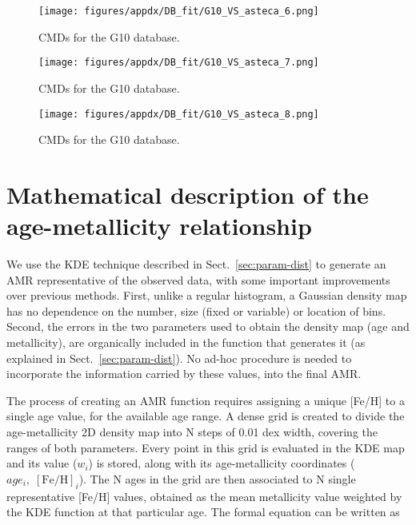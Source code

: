 \documentclass[draft]{aa}
\begin{document}
\begin{appendix}
\begin{figure*}
\texttt{[image: figures/appdx/DB\_fit/G10\_VS\_asteca\_6.png]}
\caption{CMDs for the G10 database.}
\label{fig:DBs_G10_6}
\end{figure*}
\clearpage

\begin{figure*}
\texttt{[image: figures/appdx/DB\_fit/G10\_VS\_asteca\_7.png]}
\caption{CMDs for the G10 database.}
\label{fig:DBs_G10_7}
\end{figure*}
\clearpage

\begin{figure}
\centering
\texttt{[image: figures/appdx/DB\_fit/G10\_VS\_asteca\_8.png]}
\caption{CMDs for the G10 database.}
\label{fig:DBs_G10_8}
\end{figure}





\section{Mathematical description of the age-metallicity relationship}
\label{apdx:amr_description}

We use the KDE technique described in Sect.~\ref{sec:param-dist} to
generate an AMR representative of the observed data, with some important
improvements over previous methods.
%
First, unlike a regular histogram, a Gaussian density map has no dependence on
the number, size (fixed or variable) or location of bins.
Second, the errors in the two parameters used to obtain the density map (age and
metallicity), are organically included in the function that generates it
(as explained in Sect.~\ref{sec:param-dist}). No ad-hoc procedure is needed to
incorporate the information carried by these values, into the final AMR.\@

The process of creating an AMR function
requires assigning a unique [Fe/H] to a single age value, for the available age
range.
%
A dense grid is created to divide the age-metallicity 2D density map into N
steps of 0.01 dex width, covering the ranges of both parameters. Every point in
this grid is evaluated in the KDE map and its value ($w_{i}$) is stored, along
with its age-metallicity coordinates ($age_{i},\;[\mathrm{Fe/H}]_{i}$).
%
The N ages in the grid are then associated to N single representative [Fe/H]
values, obtained as the mean metallicity value weighted by the KDE function at
that particular age. The formal equation can be written as


\end{appendix}
\end{document}
